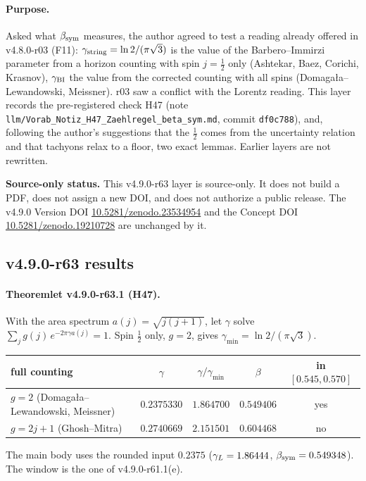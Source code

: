 \paragraph{Purpose.}
Asked what \(\beta_{\mathrm{sym}}\) measures, the author agreed to test a reading already offered in v4.8.0-r03 (F11): \(\gamma_{\mathrm{string}}=\ln2/(\pi\sqrt3)\) is the value of the
Barbero--Immirzi parameter from a horizon counting with spin \(j=\tfrac12\) only (Ashtekar, Baez, Corichi, Krasnov), \(\gamma_{\mathrm{BI}}\) the value from the corrected counting with
all spins (Domagała--Lewandowski, Meissner).  r03 saw a conflict with the Lorentz reading.  This layer records the pre-registered check H47 (note
\texttt{llm/Vorab\_Notiz\_H47\_Zaehlregel\_beta\_sym.md}, commit \texttt{df0c788}), and, following the author's suggestions that the \(\tfrac12\) comes from the uncertainty
relation and that tachyons relax to a floor, two exact lemmas.  Earlier layers are not rewritten.

\noindent\textbf{Source-only status.}
This v4.9.0-r63 layer is source-only.  It does not build a PDF, does not assign a new DOI,
and does not authorize a public release.  The v4.9.0 Version DOI
\href{https://doi.org/10.5281/zenodo.23534954}{10.5281/zenodo.23534954} and the Concept DOI
\href{https://doi.org/10.5281/zenodo.19210728}{10.5281/zenodo.19210728} are unchanged by it.

\subsection*{v4.9.0-r63 results}
\label{subsec:v490-r63-results}

\paragraph{Theoremlet v4.9.0-r63.1 (H47).}
With the area spectrum \(a(j)=\sqrt{j(j+1)}\), let \(\gamma\) solve \(\sum_j g(j)\,e^{-2\pi\gamma a(j)}=1\).  Spin \(\tfrac12\) only, \(g=2\), gives \(\gamma_{\min}=\ln2/(\pi\sqrt3)\).
\begin{center}
\small
\begin{tabular}{@{}lcccc@{}}
\toprule
full counting & \(\gamma\) & \(\gamma/\gamma_{\min}\) & \(\beta\) & in \([0.545,0.570]\)\\
\midrule
\(g=2\) (Domagała--Lewandowski, Meissner) & \(0.2375330\) & \(1.864700\) & \(0.549406\) & yes\\
\(g=2j+1\) (Ghosh--Mitra) & \(0.2740669\) & \(2.151501\) & \(0.604468\) & no\\
\bottomrule
\end{tabular}
\end{center}
The main body uses the rounded input \(0.2375\) (\(\gamma_L=1.86444\), \(\beta_{\mathrm{sym}}=0.549348\)).  The window is the one of v4.9.0-r61.1(e).

